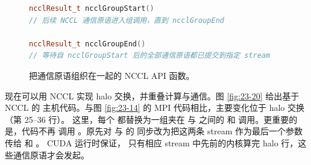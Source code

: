 \begin{figure}[htbp]
  \centering
  \begin{lstlisting}[language=C++,numbers=none,basicstyle=\ttfamily\scriptsize]
ncclResult_t ncclGroupStart()
// 后续 NCCL 通信原语进入组调用，直到 ncclGroupEnd

ncclResult_t ncclGroupEnd()
// 等待自 ncclGroupStart 后的全部通信原语都已提交到指定 stream
  \end{lstlisting}
  \caption{把通信原语组织在一起的 NCCL API 函数。}
  \label{fig:23-19}
\end{figure}

现在可以用 NCCL 实现 halo 交换，并重叠计算与通信。图 \ref{fig:23-20} 给出基于 NCCL 的
主机代码。与图 \ref{fig:23-14} 的 MPI 代码相比，主要变化位于 halo 交换（第 25--36 行）。
这里，每个  都替换为一组夹在  与
 之间的  和  调用。更重要的是，代码不再
调用 。原先对  与  的
同步改为把这两条 stream 作为最后一个参数传给  和 。
CUDA 运行时保证，
只有相应 stream 中先前的内核算完 halo 行，这些通信原语才会发起。

